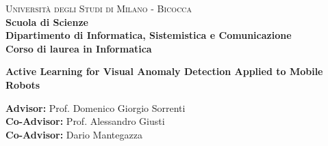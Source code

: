 \documentclass[a4paper,12pt]{report}
\begin{document}
    
    \begin{titlepage}
        
        \noindent
        \begin{minipage}[t]{0.19\textwidth}
        \end{minipage}
        \begin{minipage}[t]{0.81\textwidth}
        {
                {\textsc{Università degli Studi di Milano - Bicocca}} \\
                \textbf{Scuola di Scienze} \\
                \textbf{Dipartimento di Informatica, Sistemistica e Comunicazione} \\
                \textbf{Corso di laurea in Informatica} \\
                \par
        }
        \end{minipage}
        
	\vspace{40mm}
        
	\begin{center}
            {\LARGE{
                    \textbf{Active Learning for Visual Anomaly Detection Applied to Mobile Robots}
                    \par
            }}
        \end{center}
        
        \vspace{50mm}

         \noindent
        {\large \textbf{Advisor:} Prof. Domenico Giorgio Sorrenti} \\

        \noindent
        {\large \textbf{Co-Advisor:} Prof. Alessandro Giusti} \\
        
        \noindent
        {\large \textbf{Co-Advisor:} Dario Mantegazza}
        
        \vspace{15mm}


\end{titlepage}
\end{document}
